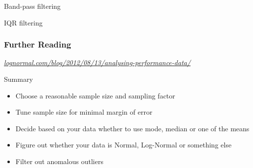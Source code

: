 \documentclass{beamer}
\newcommand{\innersplash}[1]{
  \begin{center}
    \large \textrm{\textit{ #1 } }
  \end{center}
}
\newcommand{\splashslide}[2][{}]{
  \begin{frame}
  \frametitle{#1}
  \innersplash{#2}
  \end{frame}
}
\begin{document}
\begin{frame}{Band-pass filtering}
\end{frame} 

\begin{frame}{IQR filtering}
\end{frame}

\splashslide[Further Reading]{\href{http://www.lognormal.com/blog/2012/08/13/analysing-performance-data/}{lognormal.com/blog/2012/08/13/analysing-performance-data/}}

\begin{frame}{Summary}
  \begin{itemize}
  \item Choose a reasonable sample size and sampling factor
  \item Tune sample size for minimal margin of error
  \item Decide based on your data whether to use mode, median or one of the means
  \item Figure out whether your data is Normal, Log-Normal or something else
  \item Filter out anomalous outliers
  \end{itemize}
\end{frame}
\end{document}
